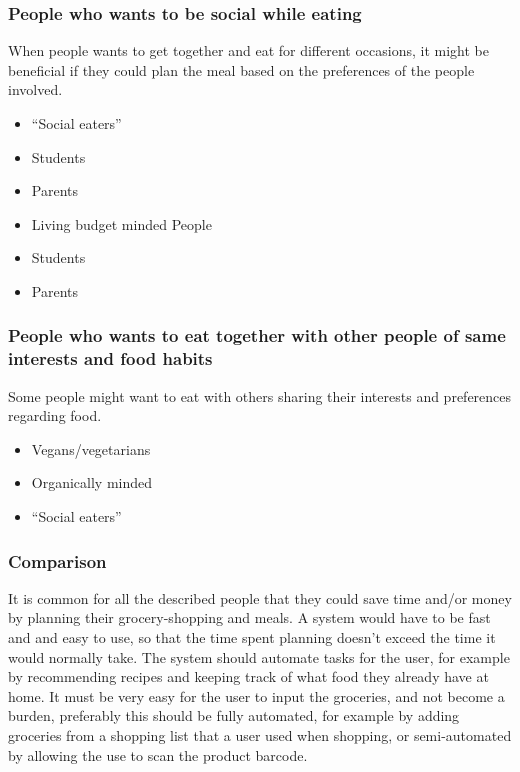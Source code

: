 \subsubsection{People who wants to be social while eating}
When people wants to get together and eat for different occasions, it might be beneficial if they could plan the meal based on the preferences of the people involved.
\begin{itemize}
\item “Social eaters”
\item Students
\item Parents
\item Living budget minded People
\item Students
\item Parents
\end{itemize}

\subsubsection{People who wants to eat together with other people of same interests and food habits}
Some people might want to eat with others sharing their interests and preferences regarding food.
\begin{itemize}
\item Vegans/vegetarians
\item Organically minded
\item “Social eaters”
\end{itemize}

\subsubsection{Comparison}
It is common for all the described people that they could save time and/or money by planning their grocery-shopping and meals. A system would have to be fast and and easy to use, so that the time spent planning doesn't exceed the time it would normally take. The system should automate tasks for the user, for example by recommending recipes and keeping track of what food they already have at home. It must be very easy for the user to input the groceries, and not become a burden, preferably this should be fully automated, for example by adding groceries from a shopping list that a user used when shopping, or semi-automated by allowing the use to scan the product barcode.



